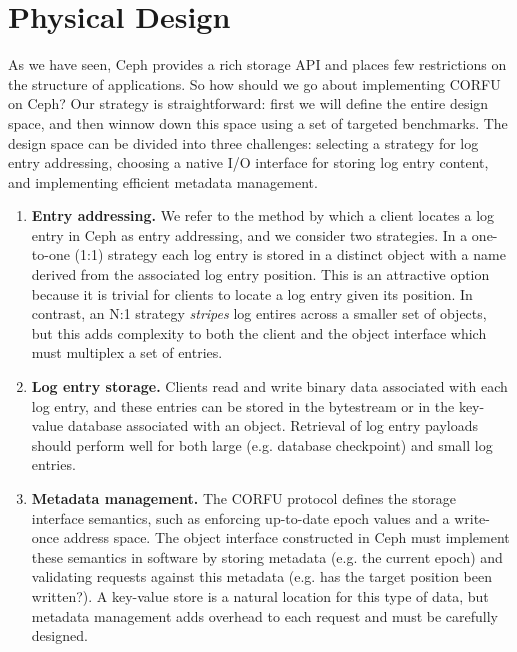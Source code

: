 \documentclass[10pt,twocolumn]{article}
\begin{document}
\section{Physical Design}

As we have seen, Ceph provides a rich storage API and places few restrictions
on the structure of applications. So how should we go about implementing CORFU
on Ceph? Our strategy is straightforward: first we will define the entire
design space, and then winnow down this space using a set of targeted
benchmarks. The design space can be divided into three challenges:
selecting a strategy for log entry addressing, choosing a native I/O interface
for storing log entry content, and implementing efficient metadata management.

\begin{enumerate}
    \item {\bf Entry addressing.} We refer to the method by which a client
        locates a log entry in Ceph as entry addressing, and we consider two
        strategies. In a one-to-one (1:1) strategy each log entry is stored in
        a distinct object with a name derived from the associated log entry
        position. This is an attractive option because it is trivial for
        clients to locate a log entry given its position.  In contrast, an N:1
        strategy \emph{stripes} log entires across a smaller set of objects,
        but this adds complexity to both the client and the object interface which
        must multiplex a set of entries.

    \item {\bf Log entry storage.} Clients read and write binary data
        associated with each log entry, and these entries can be stored in the
        bytestream or in the key-value database associated with an object.
        Retrieval of log entry payloads should perform well for both large
        (e.g. database checkpoint) and small log entries.

    \item {\bf Metadata management.} The CORFU protocol defines the storage
        interface semantics, such as enforcing up-to-date epoch values and a
        write-once address space. The object interface constructed in Ceph must
        implement these semantics in software by storing metadata (e.g. the
        current epoch) and validating requests against this metadata (e.g. has
        the target position been written?). A key-value store is a natural
        location for this type of data, but metadata management adds overhead
        to each request and must be carefully designed.
\end{enumerate}
\end{document}
